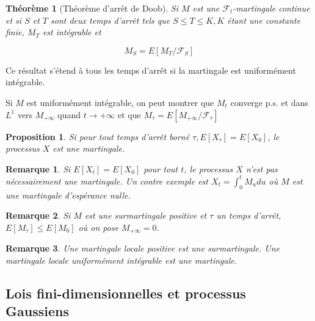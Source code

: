 \documentclass[A4paper,12pt]{report}
\newtheorem{proposition}{Proposition}[chapter]
\newtheorem{theorem}{Th\'eor\`eme}[chapter]
\newtheorem{remark}{Remarque}[chapter]
\begin{document}
\begin{theorem}[Théorème d'arrêt de Doob]
 Si $M$ est une $\mathcal{F}_{t}$-martingale continue et si $S$ et $T$ sont deux temps d'arrêt tels que $S \leq T \leq K, K$ étant une constante finie, $M_{T}$ est intégrable et

$$
M_{S}=E\left[M_{T} / \mathcal{F}_{S}\right]
$$
\end{theorem}
Ce résultat s'étend à tous les temps d'arrêt si la martingale est uniformément intégrable.

Si $M$ est uniformément intégrable, on peut montrer que $M_{t}$ converge p.s. et dans $L^{1}$ vers $M_{+\infty}$ quand $t \rightarrow+\infty$ et que $M_{\tau}=E\left[M_{+\infty} / \mathcal{F}_{\tau}\right]$

\begin{proposition} Si pour tout temps d'arrêt borné $\tau, E\left[X_{\tau}\right]=E\left[X_{0}\right]$, le processus $X$ est une martingale.
\end{proposition}


\begin{remark}
Si $E\left[X_{t}\right]=E\left[X_{0}\right]$ pour tout $t$, le processus $X$ n'est pas nécessairement une martingale. Un contre exemple est $X_{t}=\int_{0}^{t} M_{u} d u$ où $M$ est une martingale d'espérance nulle.\\
\end{remark}
\begin{remark}
Si $M$ est une surmartingale positive et $\tau$ un temps d'arrêt, $E\left[M_{\tau}\right] \leq E\left[M_{0}\right]$ où on pose $M_{+\infty}=0$.\\
\end{remark}
\begin{remark}
Une martingale locale positive est une surmartingale. Une martingale locale uniformément intégrable est une martingale.
\end{remark}
\subsection{Lois fini-dimensionnelles et processus Gaussiens}
\end{document}
